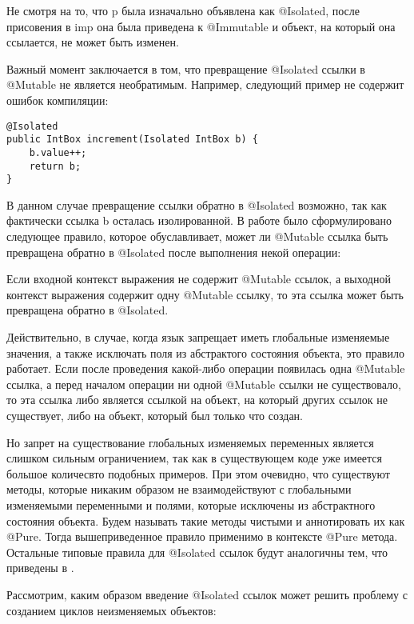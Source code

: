 Не смотря на то, что p была изначально объявлена как @Isolated, после присовения в imp она была приведена к @Immutable и объект, на который она ссылается, не может быть изменен.

Важный момент заключается в том, что превращение @Isolated ссылки в @Mutable не является необратимым. Например, следующий пример не содержит ошибок компиляции:

\begin{lstlisting}[caption=Превращение @Isolated ссылки в @Mutable и обратно, label=code:isolated_to_mutable_and_back]
@Isolated
public IntBox increment(Isolated IntBox b) { 
    b.value++; 
    return b;
}
\end{lstlisting}

В данном случае превращение ссылки обратно в @Isolated возможно, так как фактически ссылка b осталась изолированной. В работе \cite{Gordon2012} было сформулировано следующее правило, которое обуславливает, может ли @Mutable ссылка быть превращена обратно в @Isolated после выполнения некой операции:

\begin{Rule}\label{rule:convert_isolated}
Если входной контекст выражения не содержит @Mutable ссылок, а выходной контекст выражения содержит одну @Mutable ссылку, то эта ссылка может быть превращена обратно в @Isolated.
\end{Rule}

Действительно, в случае, когда язык запрещает иметь глобальные изменяемые значения, а также исключать поля из абстрактого состояния объекта, это правило работает. Если после проведения какой-либо операции появилась одна @Mutable ссылка, а перед началом операции ни одной @Mutable ссылки не существовало, то эта ссылка либо является ссылкой на объект, на который других ссылок не существует, либо на объект, который был только что создан. 

Но запрет на существование глобальных изменяемых переменных является слишком сильным ограничением, так как в существующем коде уже имеется большое количесвто подобных примеров. При этом очевидно, что существуют методы, которые никаким образом не взаимодействуют с глобальными изменяемыми переменными и полями, которые исключены из абстрактного состояния объекта. Будем называть такие методы чистыми и аннотировать их как @Pure. Тогда вышеприведенное правило применимо в контексте @Pure метода. Остальные типовые правила для @Isolated ссылок будут аналогичны тем, что приведены в \cite{Gordon2012}.

Рассмотрим, каким образом введение @Isolated ссылок может решить проблему с созданием циклов неизменяемых объектов:

